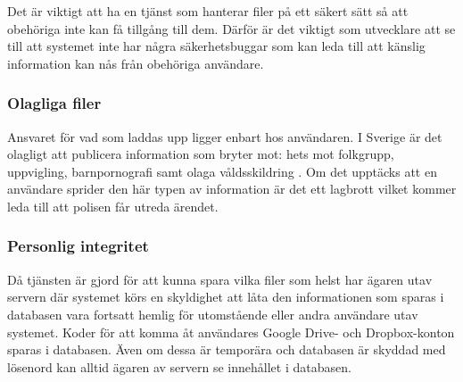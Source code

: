 Det är viktigt att ha en tjänst som hanterar filer på ett säkert sätt så att
obehöriga inte kan få tillgång till dem. Därför är det viktigt som utvecklare
att se till att systemet inte har några säkerhetsbuggar som kan leda till att
känslig information kan nås från obehöriga användare.

\subsubsection{Olagliga filer}

Ansvaret för vad som laddas upp ligger enbart hos användaren. I Sverige är det
olagligt att publicera information som bryter mot: hets mot folkgrupp,
uppvigling, barnpornografi samt olaga våldsskildring \cite{polisen}. Om det
upptäcks att en användare sprider den här typen av information är det ett
lagbrott vilket kommer leda till att polisen får utreda ärendet.

\subsubsection{Personlig integritet}

Då tjänsten är gjord för att kunna spara vilka filer som helst har ägaren utav
servern där systemet körs en skyldighet att låta den informationen som sparas i
databasen vara fortsatt hemlig för utomstående eller andra användare utav
systemet. Koder för att komma åt användares Google Drive- och Dropbox-konton
sparas i databasen. Även om dessa är temporära och databasen är skyddad med
lösenord kan alltid ägaren av servern se innehållet i databasen.
